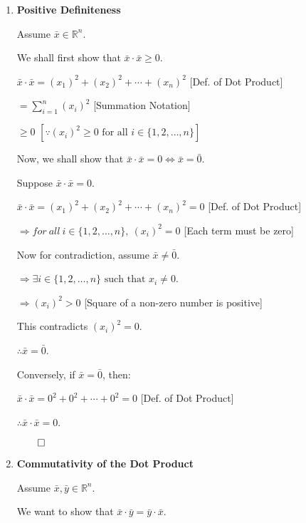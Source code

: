 
\begin{proofbox}
\begin{enumerate}[label=\arabic*., series=vecprops]

\item \textbf{Positive Definiteness}

Assume $\bar{x} \in \mathbb{R}^n$.

We shall first show that $\bar{x} \cdot \bar{x} \geq 0$.

\quad $\bar{x} \cdot \bar{x} = (x_1)^2 + (x_2)^2 + \cdots + (x_n)^2$ \hfill [Def. of Dot Product]

\quad $= \sum_{i=1}^n (x_i)^2$ \hfill [Summation Notation]

\quad $\geq 0$ \hfill $[ \because(x_i)^2 \geq 0 \text{ for all } i \in \{1, 2, \ldots, n\}]$


Now, we shall show that $\bar{x} \cdot \bar{x} = 0 \Leftrightarrow \bar{x} = \bar{0}$.

Suppose $\bar{x} \cdot \bar{x} = 0$.

\quad $\bar{x} \cdot \bar{x} = (x_1)^2 + (x_2)^2 + \cdots + (x_n)^2 = 0$ \hfill [Def. of Dot Product]

\quad $\Rightarrow for\ all\ i \in \{1, 2, \ldots, n\},\ (x_i)^2 = 0$ \hfill [Each term must be zero]

Now for contradiction, assume $\bar{x} \neq \bar{0}$.

\quad $\Rightarrow \exists i \in \{1, 2, \ldots, n\} \text{ such that } x_i \neq 0$.

\quad $\Rightarrow (x_i)^2 > 0$ \hfill [Square of a non-zero number is positive]

\quad This contradicts $(x_i)^2 = 0$.

\quad $\therefore \bar{x} = \bar{0}$.

Conversely, if $\bar{x} = \bar{0}$, then:

\quad $\bar{x} \cdot \bar{x} = 0^2 + 0^2 + \cdots + 0^2 = 0$ \hfill [Def. of Dot Product]

\quad $\therefore \bar{x} \cdot \bar{x} = 0$.

\hfill $\qed$

\item \textbf{Commutativity of the Dot Product}

Assume $\bar{x}, \bar{y} \in \mathbb{R}^n$.

We want to show that $\bar{x} \cdot \bar{y} = \bar{y} \cdot \bar{x}$.


\end{enumerate}
\end{proofbox}
